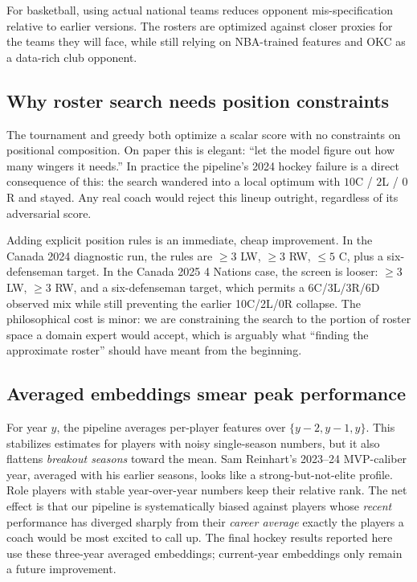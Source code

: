 \documentclass[11pt,letterpaper]{article}
\begin{document}
For basketball, using actual national teams reduces opponent
mis-specification relative to earlier versions. The rosters are
optimized against closer proxies for the teams they will face, while
still relying on NBA-trained features and OKC as a data-rich club
opponent.

\subsection{Why roster search needs position constraints}

The tournament and greedy both optimize a scalar score with no
constraints on positional composition. On paper this is elegant: ``let
the model figure out how many wingers it needs.'' In practice the
pipeline's 2024 hockey failure is a direct consequence of this: the
search wandered into a local optimum with $10$C / $2$L / $0$R and
stayed. Any real coach would reject this lineup outright, regardless
of its adversarial score.

Adding explicit position rules is an immediate, cheap improvement. In
the Canada 2024 diagnostic run, the rules are $\geq 3$ LW,
$\geq 3$ RW, $\leq 5$ C, plus a six-defenseman target. In the Canada
2025 4 Nations case, the screen is looser: $\geq 3$ LW, $\geq 3$ RW,
and a six-defenseman target, which permits a 6C/3L/3R/6D observed mix
while still preventing the earlier 10C/2L/0R collapse. The philosophical
cost is minor: we are constraining the search to the portion of roster
space a domain expert would accept, which is arguably what ``finding
the approximate roster'' should have meant from the beginning.

\subsection{Averaged embeddings smear peak performance}

For year $y$, the pipeline averages per-player features over
$\{y-2, y-1, y\}$. This stabilizes estimates for players with noisy
single-season numbers, but it also flattens \emph{breakout seasons}
toward the mean. Sam Reinhart's 2023--24 MVP-caliber year, averaged
with his earlier seasons, looks like a strong-but-not-elite profile.
Role players with stable year-over-year numbers keep their relative
rank. The net effect is that our pipeline is systematically biased
against players whose \emph{recent} performance has diverged sharply
from their \emph{career average} exactly the players a coach would
be most excited to call up.
The final hockey results reported here use these three-year averaged
embeddings; current-year embeddings only remain a future improvement.
\end{document}
